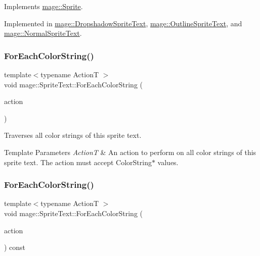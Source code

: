 Implements \hyperlink{classmage_1_1_sprite_a954a9f2046edcd6b1658a236ae23ec5a}{mage\+::\+Sprite}.



Implemented in \hyperlink{classmage_1_1_dropshadow_sprite_text_af76422c9812d7dc38e9b98e587103c67}{mage\+::\+Dropshadow\+Sprite\+Text}, \hyperlink{classmage_1_1_outline_sprite_text_a524e9ad1caeeeaa32405e61d1a5e1032}{mage\+::\+Outline\+Sprite\+Text}, and \hyperlink{classmage_1_1_normal_sprite_text_ad2a1b02bea18afd6bf61b106a727a355}{mage\+::\+Normal\+Sprite\+Text}.

\hypertarget{classmage_1_1_sprite_text_ad975957b908ad3926ace75fb60ff4474}{}\label{classmage_1_1_sprite_text_ad975957b908ad3926ace75fb60ff4474} 
\subsubsection{\texorpdfstring{For\+Each\+Color\+String()}{ForEachColorString()}\hspace{0.1cm}{\footnotesize\ttfamily [1/2]}}
{\footnotesize\ttfamily template$<$typename ActionT $>$ \\
void mage\+::\+Sprite\+Text\+::\+For\+Each\+Color\+String (\begin{DoxyParamCaption}\item[{ActionT}]{action }\end{DoxyParamCaption})\hspace{0.3cm}{\ttfamily [protected]}}

Traverses all color strings of this sprite text.


\begin{DoxyTemplParams}{Template Parameters}
{\em ActionT} & An action to perform on all color strings of this sprite text. The action must accept {\ttfamily Color\+String$\ast$} values. \\
\hline
\end{DoxyTemplParams}
\hypertarget{classmage_1_1_sprite_text_abc70368fd800a82cbd1ec31f51d4db17}{}\label{classmage_1_1_sprite_text_abc70368fd800a82cbd1ec31f51d4db17} 
\subsubsection{\texorpdfstring{For\+Each\+Color\+String()}{ForEachColorString()}\hspace{0.1cm}{\footnotesize\ttfamily [2/2]}}
{\footnotesize\ttfamily template$<$typename ActionT $>$ \\
void mage\+::\+Sprite\+Text\+::\+For\+Each\+Color\+String (\begin{DoxyParamCaption}\item[{ActionT}]{action }\end{DoxyParamCaption}) const\hspace{0.3cm}{\ttfamily [protected]}}

